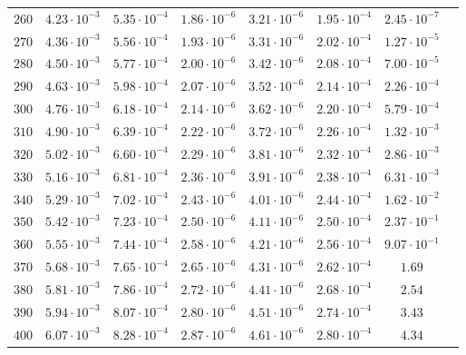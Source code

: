 \begin{table}
\begin{tabular}{lccccccc}
$260 $&$ 4.23\cdot 10^{-3} $&$ 5.35\cdot 10^{-4} $&$ 1.86\cdot 10^{-6} $&$ 3.21\cdot 10^{-6} $&$ 1.95\cdot 10^{-4} $&$ 2.45 \cdot 10^{-7}   $\\
$270 $&$ 4.36\cdot 10^{-3} $&$ 5.56\cdot 10^{-4} $&$ 1.93\cdot 10^{-6} $&$ 3.31\cdot 10^{-6} $&$ 2.02\cdot 10^{-4} $&$ 1.27\cdot 10^{-5}   $\\
$280 $&$ 4.50\cdot 10^{-3} $&$ 5.77\cdot 10^{-4} $&$ 2.00\cdot 10^{-6} $&$ 3.42\cdot 10^{-6} $&$ 2.08\cdot 10^{-4} $&$ 7.00\cdot 10^{-5}   $\\
$290 $&$ 4.63\cdot 10^{-3} $&$ 5.98\cdot 10^{-4} $&$ 2.07\cdot 10^{-6} $&$ 3.52\cdot 10^{-6} $&$ 2.14\cdot 10^{-4} $&$ 2.26\cdot 10^{-4}   $\\
$300 $&$ 4.76\cdot 10^{-3} $&$ 6.18\cdot 10^{-4} $&$ 2.14\cdot 10^{-6} $&$ 3.62\cdot 10^{-6} $&$ 2.20\cdot 10^{-4} $&$ 5.79\cdot 10^{-4}   $\\
$310 $&$ 4.90\cdot 10^{-3} $&$ 6.39\cdot 10^{-4} $&$ 2.22\cdot 10^{-6} $&$ 3.72\cdot 10^{-6} $&$ 2.26\cdot 10^{-4} $&$ 1.32\cdot 10^{-3}   $\\
$320 $&$ 5.02\cdot 10^{-3} $&$ 6.60\cdot 10^{-4} $&$ 2.29\cdot 10^{-6} $&$ 3.81\cdot 10^{-6} $&$ 2.32\cdot 10^{-4} $&$ 2.86\cdot 10^{-3}   $\\
$330 $&$ 5.16\cdot 10^{-3} $&$ 6.81\cdot 10^{-4} $&$ 2.36\cdot 10^{-6} $&$ 3.91\cdot 10^{-6} $&$ 2.38\cdot 10^{-4} $&$ 6.31\cdot 10^{-3}   $\\
$340 $&$ 5.29\cdot 10^{-3} $&$ 7.02\cdot 10^{-4} $&$ 2.43\cdot 10^{-6} $&$ 4.01\cdot 10^{-6} $&$ 2.44\cdot 10^{-4} $&$ 1.62\cdot 10^{-2}   $\\
$350 $&$ 5.42\cdot 10^{-3} $&$ 7.23\cdot 10^{-4} $&$ 2.50\cdot 10^{-6} $&$ 4.11\cdot 10^{-6} $&$ 2.50\cdot 10^{-4} $&$ 2.37\cdot 10^{-1}   $\\
$360 $&$ 5.55\cdot 10^{-3} $&$ 7.44\cdot 10^{-4} $&$ 2.58\cdot 10^{-6} $&$ 4.21\cdot 10^{-6} $&$ 2.56\cdot 10^{-4} $&$ 9.07\cdot 10^{-1}   $\\
$370 $&$ 5.68\cdot 10^{-3} $&$ 7.65\cdot 10^{-4} $&$ 2.65\cdot 10^{-6} $&$ 4.31\cdot 10^{-6} $&$ 2.62\cdot 10^{-4} $&$ 1.69  $\\
$380 $&$ 5.81\cdot 10^{-3} $&$ 7.86\cdot 10^{-4} $&$ 2.72\cdot 10^{-6} $&$ 4.41\cdot 10^{-6} $&$ 2.68\cdot 10^{-4} $&$ 2.54  $\\
$390 $&$ 5.94\cdot 10^{-3} $&$ 8.07\cdot 10^{-4} $&$ 2.80\cdot 10^{-6} $&$ 4.51\cdot 10^{-6} $&$ 2.74\cdot 10^{-4} $&$ 3.43  $\\
$400 $&$ 6.07\cdot 10^{-3} $&$ 8.28\cdot 10^{-4} $&$ 2.87\cdot 10^{-6} $&$ 4.61\cdot 10^{-6} $&$ 2.80\cdot 10^{-4} $&$ 4.34  $\\

\end{tabular}
\end{table}
